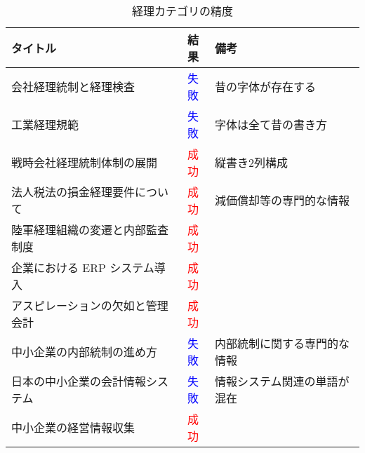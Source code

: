 \begin{table}[h]
  \label{tab:doc_accounting}
  \begin{center}
  \begin{tabular}{|l|c|l|}
    \hline
    \textbf{タイトル} & \textbf{結果} & \textbf{備考} \\ \hline
    会社経理統制と経理検査 & \textcolor{blue}{失敗} & 昔の字体が存在する \\ \hline
    工業経理規範 & \textcolor{blue}{失敗} & 字体は全て昔の書き方 \\ \hline
    戦時会社経理統制体制の展開 & \textcolor{red}{成功} & 縦書き2列構成 \\ \hline
    法人税法の損金経理要件について & \textcolor{red}{成功} & 減価償却等の専門的な情報 \\ \hline
    陸軍経理組織の変遷と内部監査制度 & \textcolor{red}{成功} & \\ \hline
    企業における ERP システム導入 & \textcolor{red}{成功} & \\ \hline
    アスピレーションの欠如と管理会計 & \textcolor{red}{成功} & \\ \hline
    中小企業の内部統制の進め方 & \textcolor{blue}{失敗} & 内部統制に関する専門的な情報 \\ \hline
    日本の中小企業の会計情報システム & \textcolor{blue}{失敗} & 情報システム関連の単語が混在 \\ \hline
    中小企業の経営情報収集 & \textcolor{red}{成功} & \\ \hline
  \end{tabular}
  \end{center}
  \caption{経理カテゴリの精度}
\end{table}

